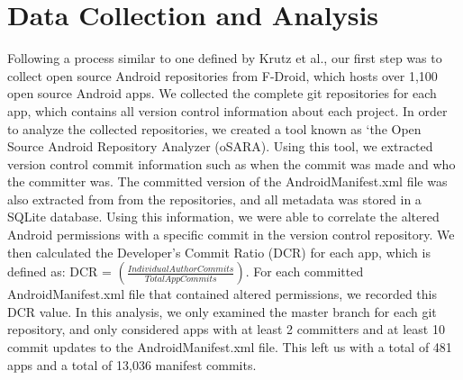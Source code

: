 \documentclass{sig-alternate-05-2015}
\begin{document}


\section{Data Collection and Analysis}
\label{sec: collection}



Following a process similar to one defined by Krutz et al.\cite{krutz2015FDroid}, our first step was to collect open source Android repositories from F-Droid, which hosts over 1,100 open source Android apps. We collected the complete git repositories for each app, which contains all version control information about each project. In order to analyze the collected repositories, we created a tool known as `the Open Source Android Repository Analyzer (oSARA). Using this tool, we extracted version control commit information such as when the commit was made and who the committer was. The committed version of the AndroidManifest.xml file was also extracted from from the repositories, and all metadata was stored in a SQLite database. Using this information, we were able to correlate the altered Android permissions with a specific commit in the version control repository. We then calculated the Developer's Commit Ratio (DCR) for each app, which is defined as: DCR = $(\frac{Individual Author Commits}{Total App Commits})$. For each committed AndroidManifest.xml file that contained altered permissions, we recorded this DCR value. In this analysis, we only examined the master branch for each git repository, and only considered apps with at least 2 committers and at least 10 commit updates to the AndroidManifest.xml file. This left us with a total of 481 apps and a total of 13,036 manifest commits.





\end{document}
